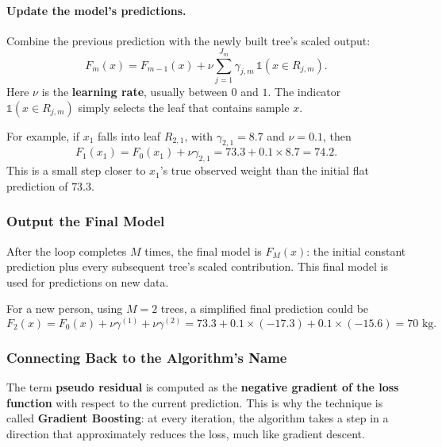 \documentclass[12pt,openany]{book}
\begin{document}
\paragraph{Update the model's predictions.}
Combine the previous prediction with the newly built tree's scaled output:
\begin{equation*}
    F_m(x)
    = F_{m-1}(x)
    + \nu\sum_{j=1}^{J_m}\gamma_{j,m}\,\mathbb{1}(x\in R_{j,m}).
\end{equation*}
Here \(\nu\) is the \textbf{learning rate}, usually between \(0\) and \(1\). The indicator \(\mathbb{1}(x\in R_{j,m})\) simply selects the leaf that contains sample \(x\).

For example, if \(x_1\) falls into leaf \(R_{2,1}\), with \(\gamma_{2,1}=8.7\) and \(\nu=0.1\), then
\begin{equation*}
    F_1(x_1)=F_0(x_1)+\nu\gamma_{2,1}
    =73.3+0.1\times8.7=74.2.
\end{equation*}
This is a small step closer to \(x_1\)'s true observed weight than the initial flat prediction of \(73.3\).

\subsubsection{Output the Final Model}

After the loop completes \(M\) times, the final model is \(F_M(x)\): the initial constant prediction plus every subsequent tree's scaled contribution. This final model is used for predictions on new data.

For a new person, using \(M=2\) trees, a simplified final prediction could be
\begin{equation*}
    F_2(x)
    = F_0(x)+\nu\gamma^{(1)}+\nu\gamma^{(2)}
    = 73.3 + 0.1\times(-17.3) + 0.1\times(-15.6)
    = 70\text{ kg}.
\end{equation*}

\subsubsection{Connecting Back to the Algorithm's Name}

The term \textbf{pseudo residual} is computed as the \textbf{negative gradient of the loss function} with respect to the current prediction. This is why the technique is called \textbf{Gradient Boosting}: at every iteration, the algorithm takes a step in a direction that approximately reduces the loss, much like gradient descent.
\end{document}
